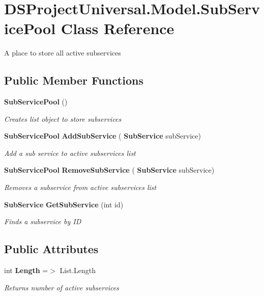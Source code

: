 \section{D\+S\+Project\+Universal.\+Model.\+Sub\+Service\+Pool Class Reference}
\label{class_d_s_project_universal_1_1_model_1_1_sub_service_pool}


A place to store all active subservices 


\subsection*{Public Member Functions}
\begin{DoxyCompactItemize}
\item 
\mbox{\label{class_d_s_project_universal_1_1_model_1_1_sub_service_pool_aaf0770dba1193da180858c6a16f87750}} 
\textbf{ Sub\+Service\+Pool} ()
\begin{DoxyCompactList}\small\item\em Creates list object to store subservices\end{DoxyCompactList}\item 
\mbox{\label{class_d_s_project_universal_1_1_model_1_1_sub_service_pool_afe561c40615586058410baba5cbd7bf4}} 
\textbf{ Sub\+Service\+Pool} \textbf{ Add\+Sub\+Service} (\textbf{ Sub\+Service} sub\+Service)
\begin{DoxyCompactList}\small\item\em Add a sub service to active subservices list\end{DoxyCompactList}\item 
\mbox{\label{class_d_s_project_universal_1_1_model_1_1_sub_service_pool_a20888fbce0c4a9f79a576c6fb4963458}} 
\textbf{ Sub\+Service\+Pool} \textbf{ Remove\+Sub\+Service} (\textbf{ Sub\+Service} sub\+Service)
\begin{DoxyCompactList}\small\item\em Removes a subservice from active subservices list\end{DoxyCompactList}\item 
\textbf{ Sub\+Service} \textbf{ Get\+Sub\+Service} (int id)
\begin{DoxyCompactList}\small\item\em Finds a subservice by ID\end{DoxyCompactList}\end{DoxyCompactItemize}
\subsection*{Public Attributes}
\begin{DoxyCompactItemize}
\item 
\mbox{\label{class_d_s_project_universal_1_1_model_1_1_sub_service_pool_ae840475ba448fe2381a45dd7950ab108}} 
int \textbf{ Length} =$>$ List.\+Length
\begin{DoxyCompactList}\small\item\em Returns number of active subservices\end{DoxyCompactList}\end{DoxyCompactItemize}
